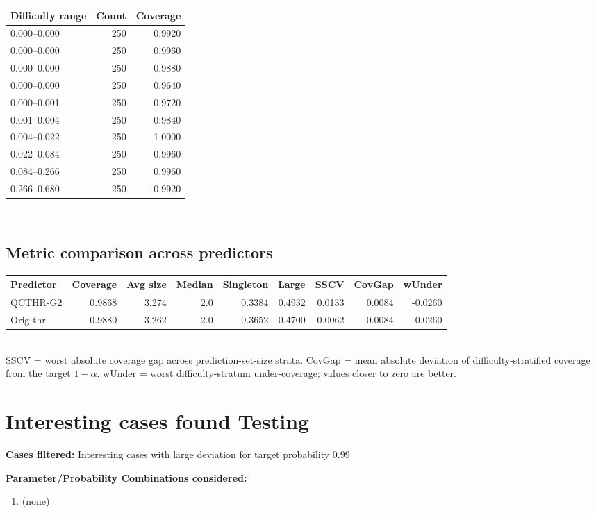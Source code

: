 \documentclass[parskip=half]{scrartcl}
\begin{document}
\begin{tabular}{l r r}
\hline
Difficulty range & Count & Coverage \\
\hline
0.000--0.000 & 250 & 0.9920 \\
0.000--0.000 & 250 & 0.9960 \\
0.000--0.000 & 250 & 0.9880 \\
0.000--0.000 & 250 & 0.9640 \\
0.000--0.001 & 250 & 0.9720 \\
0.001--0.004 & 250 & 0.9840 \\
0.004--0.022 & 250 & 1.0000 \\
0.022--0.084 & 250 & 0.9960 \\
0.084--0.266 & 250 & 0.9960 \\
0.266--0.680 & 250 & 0.9920 \\
\hline
\end{tabular}\\[0.5em]
\subsection{Metric comparison across predictors}
\begin{tabular}{l r r r r r r r r}
\hline
Predictor & Coverage & Avg size & Median & Singleton & Large & SSCV & CovGap & wUnder \\
\hline
QCTHR-G2 & 0.9868 & 3.274 & 2.0 & 0.3384 & 0.4932 & 0.0133 & 0.0084 & -0.0260 \\
Orig-thr & 0.9880 & 3.262 & 2.0 & 0.3652 & 0.4700 & 0.0062 & 0.0084 & -0.0260 \\
\hline
\end{tabular}\\[0.5em]
\textsf{\scriptsize SSCV = worst absolute coverage gap across prediction-set-size strata. CovGap = mean absolute deviation of difficulty-stratified coverage from the target $1-\alpha$. wUnder = worst difficulty-stratum under-coverage; values closer to zero are better.}\\
\section{Interesting cases found Testing}
\textbf{Cases filtered:} Interesting cases with large deviation for target probability 0.99


\textbf{Parameter/Probability Combinations considered:}\begin{enumerate}
\item (none)
\end{enumerate}
        
\end{document}

